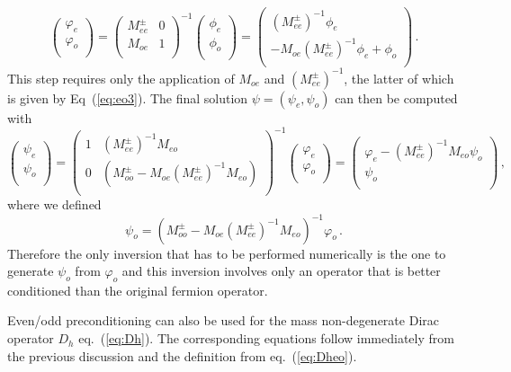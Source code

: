 \[
\begin{pmatrix}
  \varphi_e \\ \varphi_o\\
\end{pmatrix}
=
\begin{pmatrix}
  M_{ee}^\pm & 0 \\
  M_{oe}   & 1 \\
\end{pmatrix}^{-1}
\begin{pmatrix}
  \phi_e \\ \phi_o \\
\end{pmatrix}
=
\begin{pmatrix}
  (M_{ee}^\pm)^{-1} \phi_e \\ 
  -M_{oe}( M_{ee}^\pm)^{-1} \phi_e + \phi_o \\
\end{pmatrix}\, .
\]
This step requires only the application of $M_{oe}$ and
$(M_{ee}^\pm)^{-1}$, the latter of which is given by Eq~(\ref{eq:eo3}).
The final solution $\psi=(\psi_e,\psi_o)$ can then be computed with
\[
\begin{pmatrix}
  \psi_e \\ \psi_o \\
\end{pmatrix}
=
\begin{pmatrix}
  1       & (M_{ee}^\pm)^{-1}M_{eo}\\
  0       & (M_{oo}^\pm-M_{oe}(M_{ee}^\pm)^{-1}M_{eo})\\
\end{pmatrix}^{-1}
\begin{pmatrix}
  \varphi_e \\ \varphi_o \\
\end{pmatrix}
=
\begin{pmatrix}
  \varphi_e - (M_{ee}^\pm)^{-1}M_{eo}\psi_o \\ \psi_o \\
\end{pmatrix}\, ,
\]
where we defined
\[
\psi_o = (M_{oo}^\pm-M_{oe}(M_{ee}^\pm)^{-1}M_{eo})^{-1} \varphi_o\, .
\]
Therefore the only inversion that has to be performed numerically is
the one to generate $\psi_o$ from $\varphi_o$ and this inversion
involves only an operator that is better conditioned than the original
fermion operator.

Even/odd preconditioning can also be used for the mass non-degenerate
Dirac operator $D_h$ eq.~(\ref{eq:Dh}). The corresponding equations
follow immediately from the previous discussion and the definition
from eq.~(\ref{eq:Dheo}).

